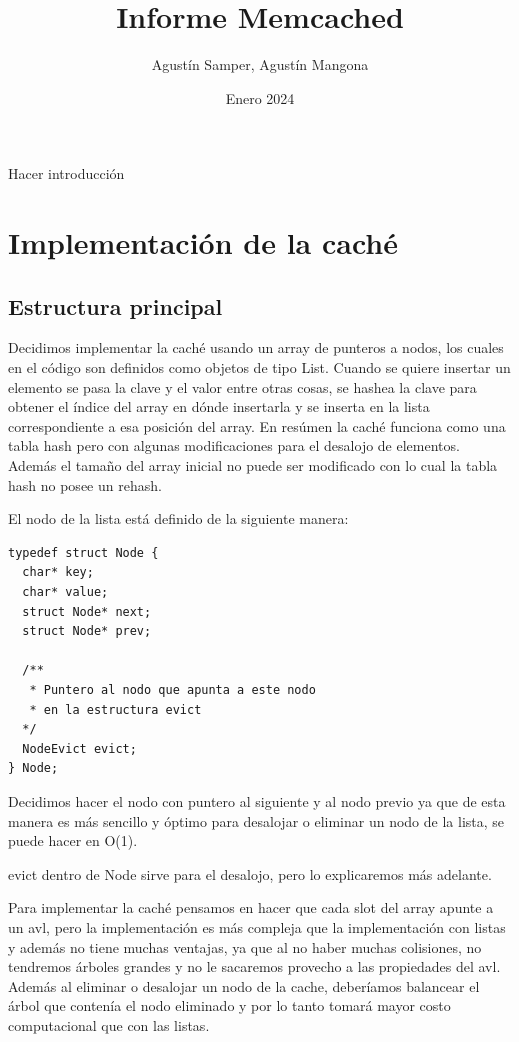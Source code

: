 \documentclass{article}
\title{Informe Memcached}
\author{Agustín Samper, Agustín Mangona}
\date{Enero 2024}
\begin{document}
\maketitle
\newpage
\tableofcontents
\newpage
Hacer introducción
\newpage
\section{Implementación de la caché}
\subsection{Estructura principal}
Decidimos implementar la caché usando un array de punteros
a nodos, los cuales en el código son definidos como objetos
de tipo List. Cuando se quiere insertar un elemento se pasa la clave y el valor entre otras cosas, se hashea
la clave para obtener el índice del array en dónde insertarla
y se inserta en la lista correspondiente a esa posición
del array. En resúmen la caché funciona como una tabla
hash pero con algunas modificaciones para el desalojo de
elementos. Además el tamaño del array inicial no puede
ser modificado con lo cual la tabla hash no posee un rehash.

El nodo de la lista está definido de la siguiente manera:

\begin{lstlisting}[style=CStyle]
typedef struct Node {
  char* key;
  char* value;
  struct Node* next;
  struct Node* prev;

  /**
   * Puntero al nodo que apunta a este nodo
   * en la estructura evict  
  */
  NodeEvict evict;
} Node; 
\end{lstlisting}

Decidimos hacer el nodo con puntero al siguiente y al
nodo previo ya que de esta manera es más sencillo y
óptimo para desalojar o eliminar un nodo de la lista, se
puede hacer en O(1).

evict dentro de Node sirve para el desalojo, pero lo
explicaremos más adelante.

Para implementar la caché pensamos en hacer que cada slot
del array apunte a un avl, pero la implementación es más
compleja que la implementación con listas y además no
tiene muchas ventajas, ya que al no haber
muchas colisiones, no tendremos árboles grandes y no le 
sacaremos provecho a las propiedades del avl. Además al
eliminar o desalojar un nodo de la cache, deberíamos
balancear el árbol que contenía el nodo eliminado y por
lo tanto tomará mayor costo computacional que con las
listas.
\end{document}
